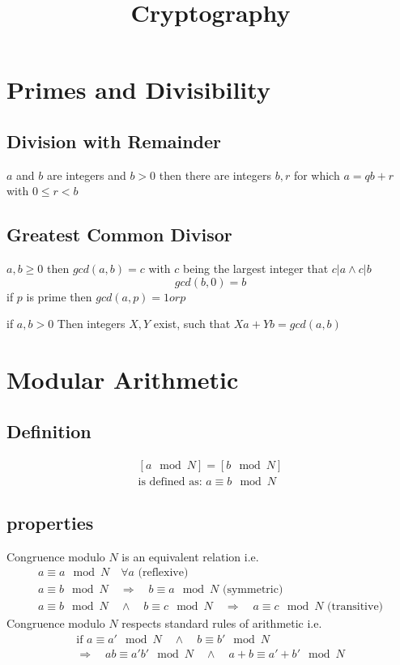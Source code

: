 \documentclass[a4paper]{article}
\begin{document}
\title{Cryptography}
\section{Primes and Divisibility} 
\subsection{Division with Remainder}
$a$ and $b$ are integers and $b>0$ then there are integers $b,r$ for which $a = qb + r$ with $0 \leq r < b$

\subsection{Greatest Common Divisor}
$a,b \geq 0$ then $gcd(a,b) = c$ with $c$ being the largest integer that $c|a \wedge c|b$
\begin{equation}
	gcd(b,0) = b 
\end{equation}
if $p$ is prime then $gcd(a,p) = 1 or p$

if $a,b > 0$ Then integers $X,Y$ exist, such that $Xa+Yb=gcd(a,b)$


\section{Modular Arithmetic}
\subsection{Definition}
\begin{equation}
    \begin{split}
	[a \mod N] = [b \mod N] \\
	\text{is defined as: } a \equiv b \mod N
    \end{split}
    \label{modulo_definition}
\end{equation}

\subsection{properties}
Congruence modulo $N$ is an equivalent relation i.e.
\begin{equation}
    \begin{split}
	a \equiv a \mod N  \quad \forall  a \text{ (reflexive)} \\
	a \equiv b \mod N \quad\Rightarrow\quad b \equiv a \mod N \text{ (symmetric)}\\
	a \equiv b \mod N  \quad\wedge\quad  b \equiv c \mod N \quad\Rightarrow\quad a \equiv c \mod N \text{ (transitive)}
    \end{split}
    \label{modulo_equivalent_relation}
\end{equation}
Congruence modulo $N$ respects standard rules of arithmetic i.e.
\begin{equation}
    \begin{split}
	\text{if }a \equiv a' \mod N \quad\wedge\quad b \equiv b' \mod N \\
	\Rightarrow\quad ab \equiv a'b' \mod N \quad\wedge\quad a+b \equiv a'+b' \mod N
    \end{split}
    \label{modulo_arithmetic_rules}
\end{equation}
\end{document}

